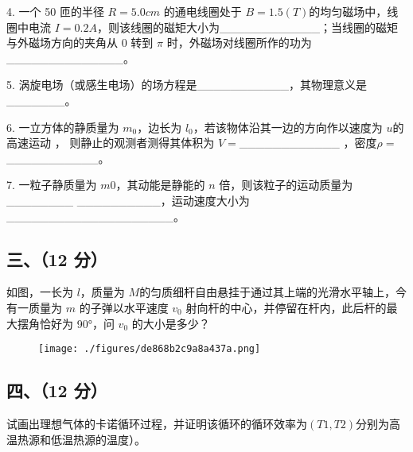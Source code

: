 4. 一个 50 匝的半径 $R=5.0cm$ 的通电线圈处于 $B=1.5(T)$的均匀磁场中，线圈中电流 $I=0.2A$，则该线圈的磁矩大小为____________；当线圈的磁矩与外磁场方向的夹角从 0 转到 $\pi$ 时，外磁场对线圈所作的功为______________。

5. 涡旋电场（或感生电场）的场方程是___________，其物理意义是_______。

6. 一立方体的静质量为 $m_0$，边长为 $l_0$，若该物体沿其一边的方向作以速度为 $u$的高速运动 ， 则静止的观测者测得其体积为 $V=$____________ ，密度$\rho=$___________。

7. 一粒子静质量为 $m0$，其动能是静能的 $n$ 倍，则该粒子的运动质量为________
__________，运动速度大小为____________________。
\subsection{三、（12 分）}
如图，一长为 $l$，质量为 $M $的匀质细杆自由悬挂于通过其上端的光滑水平轴上，今有一质量为 $m$ 的子弹以水平速度 $v_0$ 射向杆的中心，并停留在杆内，此后杆的最大摆角恰好为 90°，问 $v_0$ 的大小是多少？
\begin{figure}[ht]
\centering
\texttt{[image: ./figures/de868b2c9a8a437a.png]}
\caption{} \label{fig_NJUB07_2}
\end{figure}
\subsection{四、（12 分）}
试画出理想气体的卡诺循环过程，并证明该循环的循环效率为$(T1,T2) $分别为高温热源和低温热源的温度）。
